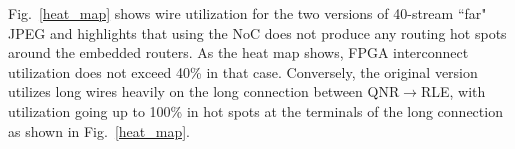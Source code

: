 Fig.~\ref{heat_map} shows wire utilization for the two versions of 40-stream ``far" JPEG and highlights that using the NoC does not produce any routing hot spots around the embedded routers.
As the heat map shows, FPGA interconnect utilization does not exceed 40\% in that case.
Conversely, the original version utilizes long wires heavily on the long connection between QNR$\rightarrow$RLE, with utilization going up to 100\% in hot spots at the terminals of the long connection as shown in Fig.~\ref{heat_map}.


%
%
